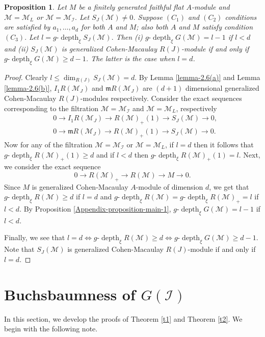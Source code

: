 \documentclass[11pt,reqno]{amsart}
\newtheorem{proposition}[theorem]{Proposition}
\theoremstyle{definition}
\newcommand{\m}{\mathfrak m}
\def\M{{\mathcal M}}
\def\I{{\mathcal I}}
\DeclareMathOperator{\depth}{depth}
\numberwithin{equation}{section}
\begin{document}
	\begin{proposition}\label{proposition-2.7}
     Let $M$ be a finitely generated faithful flat $A$-module and $\M=\M_L$ or $\M=\M_\I.$  Let $S_J(\M)\neq 0$. Suppose $(C_1)$ and $(C_2)$ conditions are satisfied by $a_1,\ldots,a_d$ for both $A$ and $M$; also both $A$ and $M$ satisfy condition $(C_3).$   Let $l=g\text{-}\depth_\xi S_J(\M).$ Then (i) $g\text{-}\depth_\xi G(\M)=l-1$
		if $l<d$ and (ii) $S_J(\M)$ is generalized Cohen-Macaulay $R(J)$-module if and only if $g\text{-} \depth_\xi G(\M)\geq d-1$. The latter is the case when $l=d$.
	\end{proposition}
	\begin{proof}
		Clearly $l\leq \dim_{R(J)} S_J(\M)=d$. By Lemma \ref{lemma-2.6(a)} and Lemma \ref{lemma-2.6(b)}, $I_1 R(\M_J)$ and $\m R(\M_J)$ are $(d+1)$ dimensional generalized Cohen-Macaulay $R(J)$-modules respectively.
	 Consider the exact sequences corresponding to the  filtration $\M=\M_\I$ and $\M=\M_L$, respectively
     \begin{align*}
         &0\to I_1 R(\M_J)\to R(\M)_+(1)\to S_J(\M)\to 0,\\
         &0\to \m R(\M_J)\to R(\M)_+(1)\to S_J(\M)\to 0.
     \end{align*}
     Now for any of the filtration $\M=\M_\I$ or $\M=\M_L$, if $l=d$ then it follows that $g\text{-} \depth_\xi R(\M)_+(1)\geq d$ and if $l<d$ then   $g\text{-} \depth_\xi R(\M)_+(1)=l$. 
		Next, we consider the exact sequence 
		$$0\to R(\M)_+\to R(\M)\to M\to 0.$$ Since $M$ is generalized Cohen-Macaulay $A$-module of dimension $d$, we get that 
		$g\text{-} \depth_\xi R(\M)\geq d$ if $l=d$ and $g\text{-} \depth_\xi R(\M)=g\text{-} \depth_\xi R(\M)_+=l$ if $l<d$. By Proposition \ref{Appendix-proposition-main-1},  $g\text{-}\depth_\xi G(\M)=l-1$ if $l<d$.
		
		Finally, we see that $l=d\Longleftrightarrow g \text{-}\depth_\xi R(\M)\geq d \Longleftrightarrow g\text{-}\depth_\xi G(\M)\geq d-1.$ Note that  
		$S_J(\M)$ is generalized Cohen-Macaulay $R(J)$-module if and only if $l=d$. 		
	\end{proof}
    \section{\texorpdfstring
{Buchsbaumness of $G(\I)$}
{Buchsbaumness of G(I)}
}\label{Section-main-1}
 In this section, we develop the proofs of Theorem \ref{t1} and Theorem \ref{t2}. We begin with the following note. 
 
\end{document}
